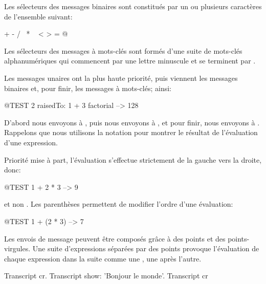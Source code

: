 \documentclass[a4paper,10pt,twoside]{book}
\begin{document}
Les s\'{e}lecteurs des messages binaires sont constitu\'{e}s par un ou plusieurs caract\`{e}res de l'ensemble suivant:
\begin{code}{}
+ - / \ * ~ < > = @ %
\end{code}
\noindent

Les s\'{e}lecteurs des messages \`{a} mots-cl\'{e}s sont form\'{e}s d'une suite de mots-cl\'{e}s alphanum\'{e}riques qui commencent par une lettre minuscule et se terminent par \lct{:}.

Les messages unaires ont la plus haute priorit\'{e}, puis viennent les messages binaires et, pour finir, les messages \`{a} mots-cl\'{e}s; ainsi:
\begin{code}{@TEST}
2 raisedTo: 1 + 3 factorial --> 128
\end{code}
D'abord nous envoyons  \`{a} , puis nous envoyons  \`{a} , et pour finir, nous envoyons  \`{a} .  
Rappelons que nous utilisons la notation \ct{-->} pour montrer le r\'{e}sultat de l'\'{e}valuation d'une expression. 

Priorit\'{e} mise \`{a} part, l'\'{e}valuation s'effectue strictement de la gauche vers la droite, donc: 
\begin{code}{@TEST}
1 + 2 * 3 --> 9
\end{code}
et non .
Les parenth\`{e}ses permettent de modifier l'ordre d'une \'{e}valuation:
\begin{code}{@TEST}
1 + (2 * 3) --> 7
\end{code}
Les envois de message peuvent \^{e}tre compos\'{e}s gr\^{a}ce \`{a} des points et des points-virgules. Une suite d'expressions s\'{e}par\'{e}es par des points provoque  l'\'{e}valuation de chaque expression dans la suite comme une , une apr\`{e}s l'autre. 

\begin{code}{}
Transcript cr.
Transcript show: 'Bonjour le monde'.
Transcript cr
\end{code}
\end{document}
